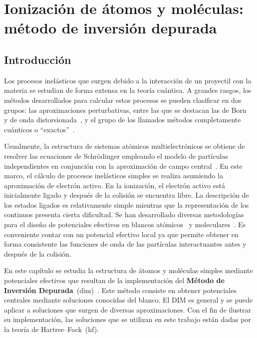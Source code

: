 \chapter{Ionización de átomos y moléculas: método de inversión depurada}
\label{chap:iondim}

\section{Introducción}

Los procesos inelásticos que surgen debido a la interacción de un 
proyectil con la materia se estudian de forma extensa en la teoría 
cuántica. A grandes rasgos, los métodos desarrollados para calcular 
estos procesos se pueden clasificar en dos grupos: las aproximaciones 
perturbativas, entre las que se destacan las de 
Born~\cite{Bates:62,McDowell:61} y de onda 
distorsionada~\cite{Crothers:10,Rivarola:87}, y el grupo de los llamados 
métodos completamente cuánticos o ``exactos''~\cite{Pindzola:07,
Burke:11,Bray:17,Zatsarinny:04,McCurdy:04}. 

Usualmente, la estructura de sistemas atómicos multielectrónicos se 
obtiene de resolver las ecuaciones de Schr\"odinger empleando el modelo 
de partículas independientes en conjunción con la aproximación de campo 
central~\cite{Bransden:03,Cowan:81}. En este marco, el cálculo de 
procesos inelásticos simples se realiza asumiendo la aproximación de 
electrón activo. En la ionización, el electrón activo está inicialmente 
ligado y después de la colisión se encuentra libre. La descripción de los 
estados ligados es relativamente simple mientras que la representación 
de los continuos presenta cierta dificultad. Se han desarrollado 
diversas metodologías para el diseño de potenciales efectivos en blancos 
atómicos~\cite{Hibbert:82,Gombas:56,Green:69,Klapisch:71,Phillips:59,
Herman:63,Dalgarno:70,Bayliss:77,Cowan:76,Lee:77} y 
moleculares~\cite{Menchero:10,Granados:16}. Es conveniente contar con un 
potencial efectivo local ya que permite obtener en forma consistente las 
funciones de onda de las partículas interactuantes antes y después de la 
colisión.

En este capítulo se estudia la estructura de átomos y moléculas simples 
mediante potenciales efectivos que resultan de la implementación del 
\textbf{Método de Inversión Depurada}~(\acs{dim})~\cite{Mendez:16,
Mendez:18,Mendez:19dim}. Este método consiste en obtener potenciales 
centrales mediante soluciones conocidas del blanco. El DIM es general 
y se puede aplicar a soluciones que surgen de diversas aproximaciones. 
Con el fin de ilustrar su implementación, las soluciones que se utilizan 
en este trabajo están dadas por la teoría de Hartree--Fock~(\acs{hf}). 

